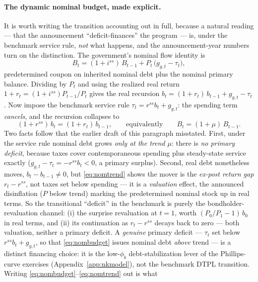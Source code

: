 \documentclass[12pt]{article}
\begin{document}
\paragraph{The dynamic nominal budget, made explicit.} It is worth writing the
transition accounting out in full, because a natural reading --- that the
announcement ``deficit-finances'' the program --- is, under the benchmark
service rule, \emph{not} what happens, and the announcement-year numbers turn
on the distinction. The government's nominal flow identity is
\begin{equation}
B_t = (1+i^{ss})\,B_{t-1} + P_t\,\bigl(g_{g,t}-\tau_t\bigr),
\label{eq:nombudget}
\end{equation}
predetermined coupon on inherited nominal debt plus the nominal primary
balance. Dividing by $P_t$ and using the realized real return
$1+r_t=(1+i^{ss})P_{t-1}/P_t$ gives the real recursion
$b_t = (1+r_t)\,b_{t-1} + g_{g,t}-\tau_t$. Now impose the benchmark service
rule $\tau_t=r^{ss}b_t+g_{g,t}$: the spending term \emph{cancels}, and the
recursion collapses to
\begin{equation}
(1+r^{ss})\,b_t = (1+r_t)\,b_{t-1},
\qquad\text{equivalently}\qquad
B_t = (1+\mu)\,B_{t-1}.
\label{eq:nomtrend}
\end{equation}
Two facts follow that the earlier draft of this paragraph misstated. First,
under the service rule nominal debt grows \emph{only at the trend $\mu$}: there
is \emph{no primary deficit}, because taxes cover contemporaneous spending plus
steady-state service exactly ($g_{g,t}-\tau_t = -r^{ss}b_t <0$, a primary
surplus). Second, real debt nonetheless moves, $b_t-b_{t-1}\neq0$, but
\eqref{eq:nomtrend} shows the mover is the \emph{ex-post return gap}
$r_t-r^{ss}$, not taxes set below spending --- it is a \emph{valuation} effect,
the announced disinflation ($P$ below trend) marking the predetermined nominal
stock up in real terms. So the transitional ``deficit'' in the benchmark is
purely the bondholder-revaluation channel: (i) the surprise revaluation at
$t=1$, worth $(P_0/P_1-1)\,b_0$ in real terms, and (ii) its continuation as
$r_t-r^{ss}$ decays back to zero --- both valuation, neither a primary deficit.
A \emph{genuine} primary deficit --- $\tau_t$ set below $r^{ss}b_t+g_{g,t}$, so
that \eqref{eq:nombudget} issues nominal debt \emph{above} trend --- is a
distinct financing choice: it is the low-$\phi_b$ debt-stabilization lever of
the Phillips-curve exercises (Appendix~\ref{app:nkmodel}), not the benchmark
DTPL transition. Writing \eqref{eq:nombudget}--\eqref{eq:nomtrend} out is what
\end{document}
